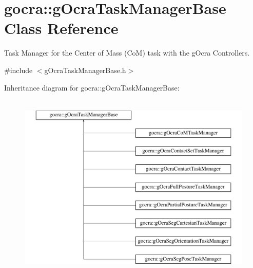 \hypertarget{classgocra_1_1gOcraTaskManagerBase}{}\section{gocra\+:\+:g\+Ocra\+Task\+Manager\+Base Class Reference}
\label{classgocra_1_1gOcraTaskManagerBase}


Task Manager for the Center of Mass (CoM) task with the g\+Ocra Controllers.  




{\ttfamily \#include $<$g\+Ocra\+Task\+Manager\+Base.\+h$>$}

Inheritance diagram for gocra\+:\+:g\+Ocra\+Task\+Manager\+Base\+:\begin{figure}[H]
\begin{center}
\leavevmode
\includegraphics[height=9.000000cm]{d5/d16/classgocra_1_1gOcraTaskManagerBase}
\end{center}
\end{figure}
